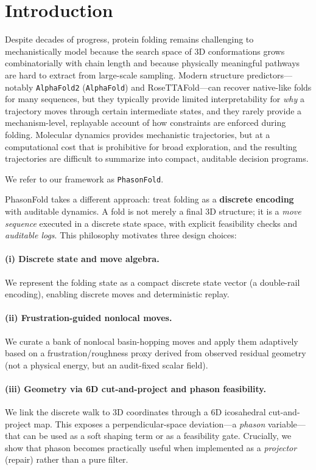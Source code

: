 \section{Introduction}

Despite decades of progress, protein folding remains challenging to mechanistically model because the search space of 3D conformations grows combinatorially with chain length and because physically meaningful pathways are hard to extract from large-scale sampling. Modern structure predictors---notably \texttt{AlphaFold2} (\texttt{AlphaFold}) and RoseTTAFold---can recover native-like folds for many sequences, but they typically provide limited interpretability for \emph{why} a trajectory moves through certain intermediate states, and they rarely provide a mechanism-level, replayable account of how constraints are enforced during folding. Molecular dynamics provides mechanistic trajectories, but at a computational cost that is prohibitive for broad exploration, and the resulting trajectories are difficult to summarize into compact, auditable decision programs.

We refer to our framework as \texttt{PhasonFold}.

PhasonFold takes a different approach: treat folding as a \textbf{discrete encoding} with auditable dynamics. A fold is not merely a final 3D structure; it is a \emph{move sequence} executed in a discrete state space, with explicit feasibility checks and \emph{auditable logs}. This philosophy motivates three design choices:

\paragraph{(i) Discrete state and move algebra.}
We represent the folding state as a compact discrete state vector (a double-rail encoding), enabling discrete moves and deterministic replay.

\paragraph{(ii) Frustration-guided nonlocal moves.}
We curate a bank of nonlocal basin-hopping moves and apply them adaptively based on a frustration/roughness proxy derived from observed residual geometry (not a physical energy, but an audit-fixed scalar field).

\paragraph{(iii) Geometry via 6D cut-and-project and phason feasibility.}
We link the discrete walk to 3D coordinates through a 6D icosahedral cut-and-project map. This exposes a perpendicular-space deviation—a \emph{phason} variable—that can be used as a soft shaping term or as a feasibility gate. Crucially, we show that phason becomes practically useful when implemented as a \emph{projector} (repair) rather than a pure filter.

